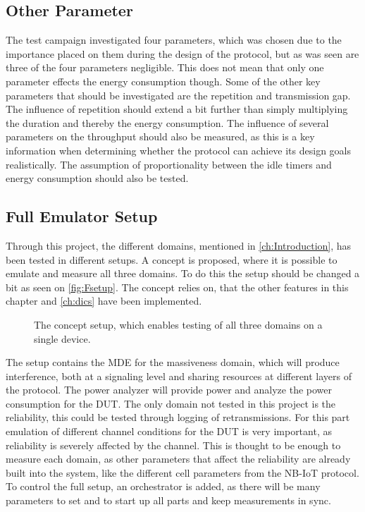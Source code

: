 \subsection{Other Parameter}
The test campaign investigated four parameters, which was chosen due to the importance placed on them during the design of the protocol, but as was seen are three of the four parameters negligible. This does not mean that only one parameter effects the energy consumption though. Some of the other key parameters that should be investigated are the repetition and transmission gap. The influence of repetition should extend a bit further than simply multiplying the duration and thereby the energy consumption. The influence of several parameters on the throughput should also be measured, as this is a key information when determining whether the protocol can achieve its design goals realistically. The assumption of proportionality between the idle timers and energy consumption should also be tested.

\subsection{Full Emulator Setup}
Through this project, the different domains, mentioned in \autoref{ch:Introduction}, has been tested in different setups. A concept is proposed, where it is possible to emulate and measure all three domains. To do this the setup should be changed a bit as seen on \autoref{fig:Fsetup}. The concept relies on, that the other features in this chapter and \autoref{ch:dics} have been implemented. 

\begin{figure}[H]
\centering
{}
\resizebox{0.7\textwidth}{!}{
}
\caption{The concept setup, which enables testing of all three domains on a single device.}
\label{fig:Fsetup}
\end{figure}


The setup contains the MDE for the massiveness domain, which will produce interference, both at a signaling level and sharing resources at different layers of the protocol. The power analyzer will provide power and analyze the power consumption for the DUT. The only domain not tested in this project is the reliability, this could be tested through logging of retransmissions. For this part emulation of different channel conditions for the DUT is very important, as reliability is severely affected by the channel. This is thought to be enough to measure each domain, as other parameters that affect the reliability are already built into the system, like the different cell parameters from the NB-IoT protocol. To control the full setup, an orchestrator is added, as there will be many parameters to set and to start up all parts and keep measurements in sync.

